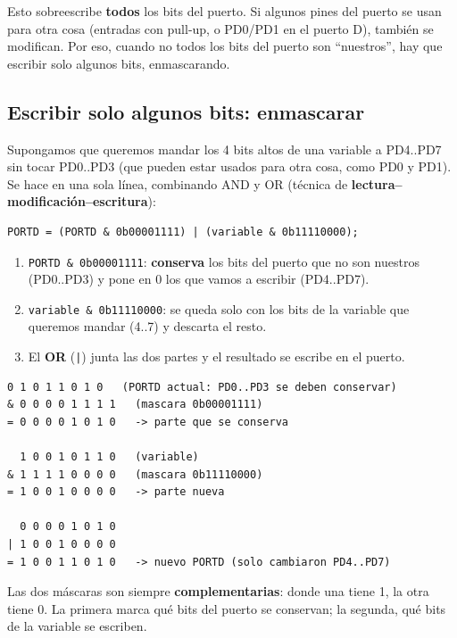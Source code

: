 \begin{advertenciabox}
Esto sobreescribe \textbf{todos} los bits del puerto. Si algunos pines del puerto se
usan para otra cosa (entradas con pull-up, o PD0/PD1 en el puerto D), también se
modifican. Por eso, cuando no todos los bits del puerto son ``nuestros'', hay que
escribir solo algunos bits, enmascarando.
\end{advertenciabox}

\subsection{Escribir solo algunos bits: enmascarar}

Supongamos que queremos mandar los 4 bits altos de una variable a PD4..PD7 sin tocar
PD0..PD3 (que pueden estar usados para otra cosa, como PD0 y PD1). Se hace en una sola
línea, combinando AND y OR (técnica de \textbf{lectura--modificación--escritura}):

\begin{lstlisting}[style=estilo-c]
PORTD = (PORTD & 0b00001111) | (variable & 0b11110000);
\end{lstlisting}

\begin{enumerate}
  \item \texttt{PORTD \& 0b00001111}: \textbf{conserva} los bits del puerto que no son
        nuestros (PD0..PD3) y pone en 0 los que vamos a escribir (PD4..PD7).
  \item \texttt{variable \& 0b11110000}: se queda solo con los bits de la variable que
        queremos mandar (4..7) y descarta el resto.
  \item El \textbf{OR} (\texttt{|}) junta las dos partes y el resultado se escribe en el puerto.
\end{enumerate}

\begin{lstlisting}[style=estilo-pseudocode]
  0 1 0 1 1 0 1 0   (PORTD actual: PD0..PD3 se deben conservar)
& 0 0 0 0 1 1 1 1   (mascara 0b00001111)
= 0 0 0 0 1 0 1 0   -> parte que se conserva

  1 0 0 1 0 1 1 0   (variable)
& 1 1 1 1 0 0 0 0   (mascara 0b11110000)
= 1 0 0 1 0 0 0 0   -> parte nueva

  0 0 0 0 1 0 1 0
| 1 0 0 1 0 0 0 0
= 1 0 0 1 1 0 1 0   -> nuevo PORTD (solo cambiaron PD4..PD7)
\end{lstlisting}

\begin{notabox}
Las dos máscaras son siempre \textbf{complementarias}: donde una tiene 1, la otra tiene 0.
La primera marca qué bits del puerto se conservan; la segunda, qué bits de la variable se
escriben.
\end{notabox}

